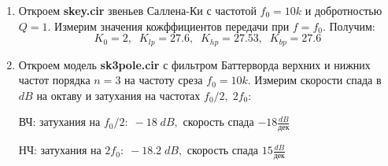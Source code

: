 \documentclass[12pt,a4paper]{article}
\begin{document}
\begin{enumerate}
    \item Откроем \textbf{skey.cir} звеньев Саллена-Ки с частотой $f_0 = 10k$ и добротностью $Q=1$.
    Измерим значения кожффициентов передачи при $f= f_0$. Получим:
    $$K_0=2,\;\;K_{lp} = 27.6,\;\; K_{hp} = 27.53,\;\; K_{bp} = 27.6$$
    \item Откроем модель \textbf{sk3pole.cir} с фильтром Баттерворда верхних и нижних частот порядка $n = 3$
    на частоту среза $f_0 = 10k$. Измерим скорости спада в $dB$ на октаву и затухания на частотах $f_0/2, \; 2f_0$: \par 
    ВЧ: затухания на $f_0/2: \; -18\; dB,$ скорость спада $-18 \frac{dB}{дек}$ \par 
    НЧ: затухания на $2f_0: \; - 18.2\; dB,$ скорость спада $15 \frac{dB}{дек}$ \par 

    \ 

\end{enumerate}






\end{document}
